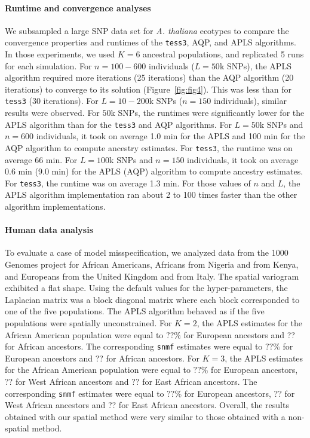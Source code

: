 \paragraph{Runtime and convergence analyses} We subsampled a large SNP data set
for {\it A. thaliana} ecotypes to compare the convergence properties and
runtimes of the {\tt tess3}, AQP, and APLS algorithms. In those experiments, we
used $K = 6$ ancestral populations, and replicated 5 runs for each simulation.
For $n = 100-600$ individuals ($L = 50$k SNPs), the APLS algorithm required more
iterations (25 iterations) than the AQP algorithm (20 iterations) to converge to
its solution (Figure~\ref{fig:fig4}). This was less than for {\tt tess3} (30 iterations). For
$L = 10-200$k SNPs ($n = 150$ individuals), similar results were observed. For
$50$k SNPs, the runtimes were significantly lower for the APLS algorithm than
for the {\tt tess3} and AQP algorithms. For $L = 50$k SNPs and $n = 600$
individuals, it took on average 1.0 min for the APLS and 100 min for the AQP
algorithm to compute ancestry estimates. For {\tt tess3}, the runtime was on
average 66 min. For $L = 100$k SNPs and $n = 150$ individuals, it took on
average 0.6 min (9.0 min) for the APLS (AQP) algorithm to compute ancestry
estimates. For {\tt tess3}, the runtime was on average 1.3 min. For those
values of $n$ and $L$, the APLS algorithm implementation ran about 2 to 100
times faster than the other algorithm implementations.
 
\paragraph{Human data analysis} To evaluate a case of model misspecification, we
analyzed data from the 1000 Genomes project for African Americans, Africans from
Nigeria and from Kenya, and Europeans from the United Kingdom and from Italy.
The spatial variogram exhibited a flat shape. Using the default values for the
hyper-parameters, the Laplacian matrix was a block diagonal matrix where each
block corresponded to one of the five populations. The APLS algorithm behaved as
if the five populations were spatially unconstrained. For $K = 2$, the APLS
estimates for the African American population were equal to $??\%$ for European
ancestors and ?? for African ancestors. The corresponding {\tt snmf} estimates
were equal to $??\%$ for European ancestors and ?? for African ancestors. For $K
= 3$, the APLS estimates for the African American population were equal to
$??\%$ for European ancestors, ?? for West African ancestors and ?? for East
African ancestors. The corresponding {\tt snmf} estimates were equal to $??\%$
for European ancestors, ?? for West African ancestors and ?? for East African
ancestors. Overall, the results obtained with our spatial method were very
similar to those obtained with a non-spatial method.


